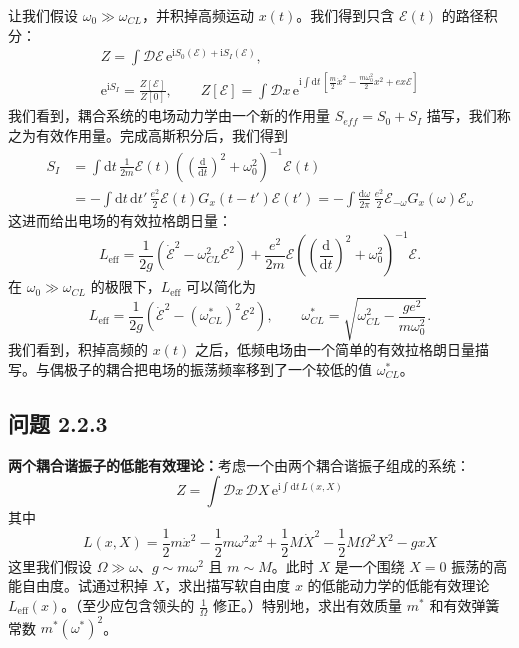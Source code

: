 让我们假设 $\omega_0\gg\omega_{CL}$，并积掉高频运动 $x(t)$。我们得到只含 $\mathcal{E}(t)$ 的路径积分：
\begin{equation*}
\begin{gathered}
Z=\int\mathcal{D}\mathcal{E}\,\mathrm{e}^{\mathrm{i}S_0(\mathcal{E})+\mathrm{i}S_I(\mathcal{E})},\\
\mathrm{e}^{\mathrm{i}S_I}=\frac{Z[\mathcal{E}]}{Z[0]},\qquad Z[\mathcal{E}]=\int\mathcal{D}x\,\mathrm{e}^{\mathrm{i}\int\mathrm{d}t\,\left[\frac{m}{2}\dot{x}^2-\frac{m\omega_0^2}{2}x^2+ex\mathcal{E}\right]}
\end{gathered}
\end{equation*}
我们看到，耦合系统的电场动力学由一个新的作用量 $S_{eff}=S_0+S_I$ 描写，我们称之为有效作用量。完成高斯积分后，我们得到
\begin{align*}
S_I&=\int\mathrm{d}t\,\frac{1}{2m}\mathcal{E}(t)\left(\left(\frac{\mathrm{d}}{\mathrm{d}t}\right)^2+\omega_0^2\right)^{-1}\mathcal{E}(t)\nonumber\\
&=-\int\mathrm{d}t\,\mathrm{d}t'\,\frac{e^2}{2}\mathcal{E}(t)G_x(t-t')\mathcal{E}(t')=-\int\frac{\mathrm{d}\omega}{2\pi}\,\frac{e^2}{2}\mathcal{E}_{-\omega}G_x(\omega)\mathcal{E}_\omega
\end{align*}
这进而给出电场的有效拉格朗日量：
\begin{equation*}
L_{\mathrm{eff}}=\frac{1}{2g}(\dot{\mathcal{E}}^2-\omega_{CL}^2\mathcal{E}^2)+\frac{e^2}{2m}\mathcal{E}\left(\left(\frac{\mathrm{d}}{\mathrm{d}t}\right)^2+\omega_0^2\right)^{-1}\mathcal{E}.
\end{equation*}
在 $\omega_0\gg\omega_{CL}$ 的极限下，$L_{\mathrm{eff}}$ 可以简化为
\begin{equation*}
L_{\mathrm{eff}}=\frac{1}{2g}(\dot{\mathcal{E}}^2-(\omega_{CL}^*)^2\mathcal{E}^2),\qquad \omega_{CL}^*=\sqrt{\omega_{CL}^2-\frac{ge^2}{m\omega_0^2}}.
\end{equation*}
我们看到，积掉高频的 $x(t)$ 之后，低频电场由一个简单的有效拉格朗日量描写。与偶极子的耦合把电场的振荡频率移到了一个较低的值 $\omega_{CL}^*$。

\subsection*{问题 2.2.3}

\textbf{两个耦合谐振子的低能有效理论：}考虑一个由两个耦合谐振子组成的系统：
\begin{equation*}
Z=\int\mathcal{D}x\,\mathcal{D}X\,\mathrm{e}^{\mathrm{i}\int\mathrm{d}t\,L(x,X)}
\end{equation*}
其中
\begin{equation*}
L(x,X)=\frac{1}{2}m\dot{x}^2-\frac{1}{2}m\omega^2x^2+\frac{1}{2}M\dot{X}^2-\frac{1}{2}M\Omega^2X^2-gxX
\end{equation*}
这里我们假设 $\Omega\gg\omega$、$g\sim m\omega^2$ 且 $m\sim M$。此时 $X$ 是一个围绕 $X=0$ 振荡的高能自由度。试通过积掉 $X$，求出描写软自由度 $x$ 的低能动力学的低能有效理论 $L_{\mathrm{eff}}(x)$。（至少应包含领头的 $\frac{1}{\Omega}$ 修正。）特别地，求出有效质量 $m^*$ 和有效弹簧常数 $m^*(\omega^*)^2$。

